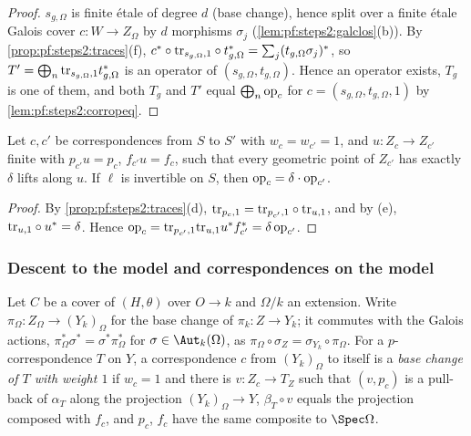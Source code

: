 \begin{proof}
$s_{g,\Omega}$ is finite \'etale of degree $d$ (base change), hence split over a finite \'etale
Galois cover $c\colon W\to Z_\Omega$ by $d$ morphisms $\sigma_j$ (\cref{lem:pf:steps2:galclos}(b)). By \cref{prop:pf:steps2:traces}(f),
$c^\ast\circ\mathrm{tr}_{s_{g,\Omega},1}\circ t^\ast_{g,\Omega}=\sum_j(t_{g,\Omega}\sigma_j)^\ast$, so
$T'=\bigoplus_n\mathrm{tr}_{s_{g,\Omega},1}t_{g,\Omega}^\ast$ is an operator of
$(s_{g,\Omega},t_{g,\Omega})$. Hence an operator exists, $T_g$ is one of them, and both $T_g$ and $T'$
equal $\bigoplus_n\mathrm{op}_c$ for $c=(s_{g,\Omega},t_{g,\Omega},1)$ by \cref{lem:pf:steps2:corropeq}.
\end{proof}

\begin{lemma}\label{lem:pf:steps2:opcover}
Let $c,c'$ be correspondences from $S$ to $S'$ with $w_c=w_{c'}=1$, and $u\colon Z_c\to Z_{c'}$ finite
with $p_{c'}u=p_c$, $f_{c'}u=f_c$, such that every geometric point of $Z_{c'}$ has exactly $\delta$
lifts along $u$. If $\ell$ is invertible on $S$, then $\mathrm{op}_c=\delta\cdot\mathrm{op}_{c'}$.
\end{lemma}

\begin{proof}
By \cref{prop:pf:steps2:traces}(d), $\mathrm{tr}_{p_c,1}=\mathrm{tr}_{p_{c'},1}\circ\mathrm{tr}_{u,1}$, and
by (e), $\mathrm{tr}_{u,1}\circ u^\ast=\delta$. Hence
$\mathrm{op}_c=\mathrm{tr}_{p_{c'},1}\mathrm{tr}_{u,1}u^\ast f_{c'}^\ast=\delta\,\mathrm{op}_{c'}$.
\end{proof}

\subsubsection{Descent to the model and correspondences on the model}

Let $C$ be a cover of $(H,\theta)$ over $O\to k$ and $\Omega/k$ an extension. Write
$\pi_\Omega\colon Z_\Omega\to(Y_k)_\Omega$ for the base change of $\pi_k\colon Z\to Y_k$; it commutes
with the Galois actions, $\pi_\Omega^\ast\sigma^\ast=\sigma^\ast\pi_\Omega^\ast$ for
$\sigma\in\Aut_k(\Omega)$, as $\pi_\Omega\circ\sigma_Z=\sigma_{Y_k}\circ\pi_\Omega$. For a
$p$-correspondence $T$ on $Y$, a correspondence $c$ from $(Y_k)_\Omega$ to itself is a \emph{base
change of $T$ with weight $1$} if $w_c=1$ and there is $v\colon Z_c\to T_Z$ such that $(v,p_c)$ is a
pull-back of $\alpha_T$ along the projection $(Y_k)_\Omega\to Y$, $\beta_T\circ v$ equals the
projection composed with $f_c$, and $p_c$, $f_c$ have the same composite to $\Spec\Omega$.

